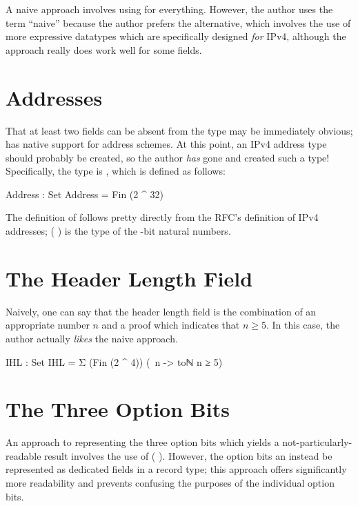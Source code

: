 \documentclass{report}
\begin{document}
A naive approach involves using  for everything.  However, the author uses the term ``naive'' because the author prefers the alternative, which involves the use of more expressive datatypes which are specifically designed \emph{for} IPv4, although the  approach really does work well for some fields.

\section{Addresses}
That at least two fields can be absent from the  type may be immediately obvious;  has native support for address schemes.  At this point, an IPv4 address type should probably be created, so the author \emph{has} gone and created such a type!  Specifically, the type is , which is defined as follows:

\begin{code}
  Address : Set
  Address = Fin (2 ^ 32)
\end{code}

The definition of  follows pretty directly from the RFC's definition of IPv4 addresses;  \AgdaSymbol( \AgdaOperator{\AgdaFunction{\textasciicircum{}}} \AgdaSymbol) is the type of the -bit natural numbers.

\section{The Header Length Field}
Naively, one can say that the header length field is the combination of an appropriate  number \(n\) and a proof which indicates that \(n \geq 5\).  In this case, the author actually \emph{likes} the naive approach.

\begin{code}
  IHL : Set
  IHL = Σ (Fin (2 ^ 4)) (\ n -> toℕ n ≥ 5)
\end{code}

\section{The Three Option Bits}
An approach to representing the three option bits which yields a not-particularly-readable result involves the use of  \AgdaSymbol( \AgdaOperator{\AgdaFunction{\textasciicircum{}}} \AgdaSymbol).  However, the option bits an instead be represented as dedicated  fields in a record type; this approach offers significantly more readability and prevents confusing the purposes of the individual option bits.
\end{document}
